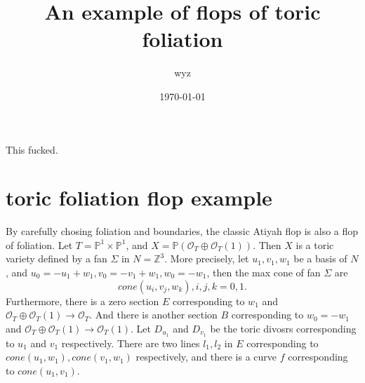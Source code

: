 \documentclass{article}
\title{An example of flops of toric foliation}
\author{wyz}
\date{\today}
\begin{document}
\maketitle
This fucked.
\section{toric foliation flop example}
By carefully chosing foliation and boundaries, the classic Atiyah flop is also a flop of foliation. Let $T= \mathbb{P}^{1} \times \mathbb{P}^{1}$, and $X= \mathbb{P}(\mathcal{O}_{T} \oplus \mathcal{O}_{T}(1))$. Then $X$ is a toric variety defined by a fan $\Sigma$ in $N= \mathbb{Z}^{3}$. More precisely, let $u_{1},v_{1},w_{1}$ be a basis of $N$, and $u_{0}=-u_{1}+w_{1},v_{0}=-v_{1}+w_{1},w_{0}=-w_{1}$, then the max cone of fan $\Sigma$ are
\[
  cone(u_{i},v_{j},w_{k}),i,j,k=0,1.
\]
Furthermore, there is a zero section $E$ corresponding to $w_{1}$ and $\mathcal{O}_{T} \oplus \mathcal{O}_{T}(1) \to \mathcal{O}_{T}$. And there is another section $B$  corresponding to $w_{0}=-w_{1}$ and $\mathcal{O}_{T} \oplus \mathcal{O}_{T}(1) \to \mathcal{O}_{T}(1)$. Let $D_{u_{1}}$ and $D_{v_{1}}$ be the toric divosrs corresponding to  $u_{1}$ and $v_{1}$ respectively.
There are two lines $l_{1},l_{2}$ in $E$ corresponding to $cone(u_{1},w_{1}),cone(v_{1},w_{1})$ respectively, and there is a curve $f$ corresponding to $cone(u_{1},v_{1})$.
\end{document}
